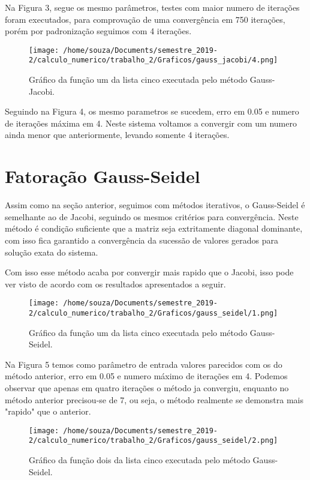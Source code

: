 \documentclass[12pt]{article}
\begin{document}
Na Figura 3, segue os mesmo parâmetros, testes com maior numero de iterações foram executados, para comprovação de uma convergência em 750 iterações, porém por padronização seguimos com 4 iterações.

\begin{figure}[!h]
    \centering
    \texttt{[image: /home/souza/Documents/semestre\_2019-2/calculo\_numerico/trabalho\_2/Graficos/gauss\_jacobi/4.png]}
    \caption{Gráfico da função um da lista cinco executada pelo método Gauss-Jacobi.}
\end{figure}

Seguindo na Figura 4, os mesmo parametros se sucedem, erro em 0.05 e numero de iterações máxima em 4. Neste sistema voltamos a convergir com um numero ainda menor que anteriormente, levando somente 4 iterações.

\section{Fatoração Gauss-Seidel}

Assim como na seção anterior, seguimos com métodos iterativos, o Gauss-Seidel é semelhante ao de Jacobi, seguindo os mesmos critérios para convergência. Neste método é condição suficiente que a matriz seja extritamente diagonal dominante, com isso fica garantido a convergência da sucessão de valores gerados para solução exata do sistema.

Com isso esse método acaba por convergir mais rapido que o Jacobi, isso pode ver visto de acordo com os resultados apresentados a seguir.

\begin{figure}[!h]
    \centering
    \texttt{[image: /home/souza/Documents/semestre\_2019-2/calculo\_numerico/trabalho\_2/Graficos/gauss\_seidel/1.png]}
    \caption{Gráfico da função um da lista cinco executada pelo método Gauss-Seidel.}
\end{figure}

Na Figura 5 temos como parâmetro de entrada valores parecidos com os do método anterior, erro em 0.05 e numero máximo de iterações em 4. Podemos observar que apenas em quatro iterações o método ja convergiu, enquanto no método anterior precisou-se de 7, ou seja, o método realmente se demonstra mais "rapido" que o anterior.

\begin{figure}[!h]
    \centering
    \texttt{[image: /home/souza/Documents/semestre\_2019-2/calculo\_numerico/trabalho\_2/Graficos/gauss\_seidel/2.png]}
    \caption{Gráfico da função dois da lista cinco executada pelo método Gauss-Seidel.}
\end{figure}
\end{document}
